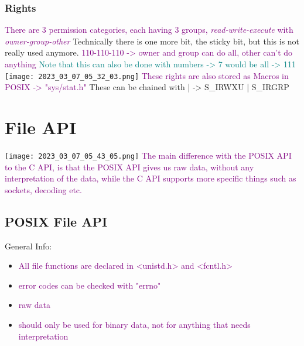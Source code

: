 \documentclass[main.tex,fontsize=8pt,paper=a4,paper=portrait,DIV=calc,]{scrartcl}
\begin{document}
\subsubsection{Rights}
\textcolor{purple}{There are 3 permission categories, each having 3 groups, \emph{read-write-execute} with \emph{owner-group-other}}\newline
Technically there is one more bit, the sticky bit, but this is not really used anymore.\newline
\textcolor{purple}{110-110-110 -> owner and group can do all, other can't do anything}\newline
\textcolor{teal}{Note that this can also be done with numbers -> 7 would be all -> 111}\newline
\texttt{[image: 2023\_03\_07\_05\_32\_03.png]}\newline
\textcolor{purple}{These rights are also stored as Macros in POSIX -> "sys/stat.h"}\newline
These can be chained with | -> S\_IRWXU | S\_IRGRP

\section{File API}
\texttt{[image: 2023\_03\_07\_05\_43\_05.png]}
\textcolor{purple}{The main difference with the POSIX API to the C API, is that the POSIX API gives us raw data, without any interpretation of the data, while the C API supports more specific things such as sockets, decoding etc.}

\subsection{POSIX File API}
General Info:
\begin{itemize}
\item \textcolor{purple}{All file functions are declared in <unistd.h> and <fcntl.h>}
\item \textcolor{purple}{error codes can be checked with "errno"}
\item \textcolor{purple}{raw data}
\item \textcolor{purple}{should only be used for binary data, not for anything that needs interpretation}
\end{itemize} 
\end{document}
